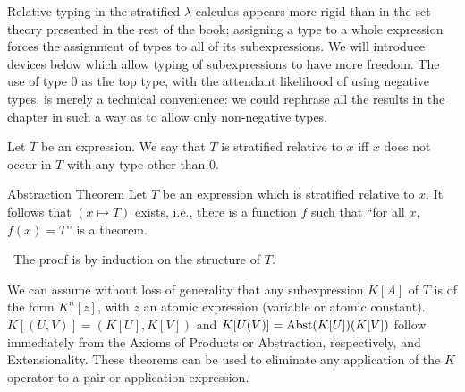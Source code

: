 Relative typing in the stratified $\lambda$-calculus appears more
rigid than in the set theory presented in the rest of the book;
assigning a type to a whole expression forces the assignment of types
to all of its subexpressions.  We will introduce devices below which
allow typing of subexpressions to have more freedom.  The use of type
0 as the top type, with the attendant likelihood of using negative
types, is merely a technical convenience: we could rephrase all the
results in the chapter in such a way as to allow only non-negative
types.

\pagebreak

\begin{definition}
 Let $T$ be an expression.  We say that $T$ is {\upshape
 stratified relative to $x$} iff $x$ does not occur in
 $T$ with any type other than 0.
\end{definition}

\begin{Thm}{Abstraction Theorem}
 Let $T$ be an expression which is stratified
 relative to $x$.  It follows that $(x \mapsto T)$ exists, i.e., there 
 is a function $f$ such that ``for all $x$, $f(x) = T$'' is a
 theorem. 
\end{Thm}

\preuve\ The proof is by induction on the structure
of $T$.

We can assume without loss of generality that any subexpression $K[A]$
of $T$ is of the form $K^n[z]$, with $z$ an atomic expression
(variable or atomic constant).  $K[(U,V)] = (K[U],K[V])$ and
$K[U(V)] = \mathop{\mathrm{Abst}}(K[U])(K[V])$ follow immediately from the Axioms of
Products or Abstraction, respectively, and
Extensionality.  These 
theorems can be used to eliminate any application of the $K$ operator to
a pair or application expression.

